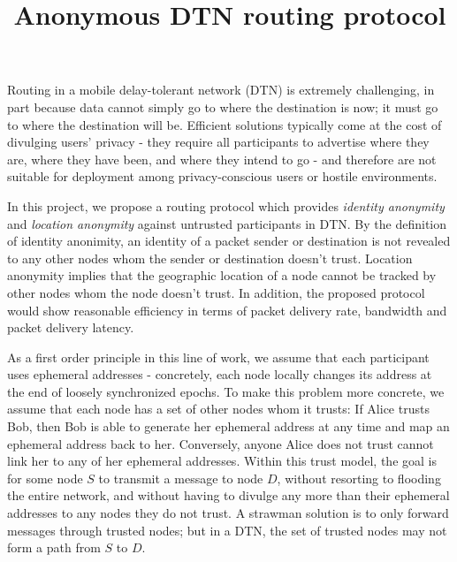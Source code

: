 \documentclass[11pt]{article}
\begin{document}
\title{Anonymous DTN routing protocol}
\date{}
\maketitle


Routing in a mobile delay­-tolerant network (DTN) is extremely challenging, in part because data cannot simply go to where the destination is now; it must go to where the destination will be. 
Efficient solutions typically come at the cost of divulging users’ privacy - they require all participants to advertise where they are, where they have been, and where they intend to go - and therefore are not suitable for deployment among privacy­-conscious users or hostile environments. 


In this project, we propose a routing protocol which provides \textit{identity anonymity} and \textit{location anonymity} against untrusted participants in DTN. 
By the definition of identity anonimity, an identity of a packet sender or destination is not revealed to any other nodes whom the sender or destination doesn't trust. 
Location anonymity implies that the geographic location of a node cannot be tracked by other nodes whom the node doesn't trust. 
In addition, the proposed protocol would show reasonable efficiency in terms of packet delivery rate, bandwidth and packet delivery latency. 


As a first order principle in this line of work, we assume that each participant uses ephemeral addresses - concretely, each node locally changes its address at the end of loosely synchronized epochs.
To make this problem more concrete, we assume that each node has a set of other nodes whom it trusts: 
If Alice trusts Bob, then Bob is able to generate her ephemeral address at any time and map an ephemeral address back to her. 
Conversely, anyone Alice does not trust cannot link her to any of her ephemeral addresses. 
Within this trust model, the goal is for some node $S$ to transmit a message to node $D$, without resorting to flooding the entire network, and without having to divulge any more than their ephemeral addresses to any nodes they do not trust. 
A strawman solution is to only forward messages through trusted nodes; but in a DTN, the set of trusted nodes may not form a path from $S$ to $D$. 
\end{document}
